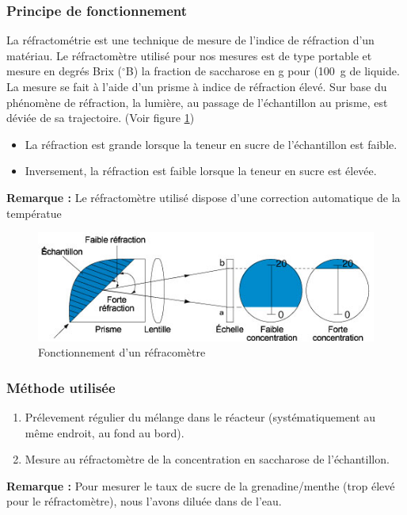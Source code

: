 \documentclass[a4paper,11pt, french]{article}
\begin{document}
		\subsubsection{Principe de fonctionnement}
			La réfractométrie est une technique de mesure de l'indice de réfraction d'un matériau. Le réfractomètre utilisé pour nos mesures est de type portable et mesure en degrés Brix ($^{\circ}$B) la fraction de saccharose en \si{\gram} pour (\SI{100}{\gram} de liquide. La mesure se fait à l'aide d'un prisme à indice de réfraction élevé. Sur base du phénomène de réfraction, la lumière, au passage de l'échantillon au prisme, est déviée de sa trajectoire. (Voir figure \ref{refractometrie})
			\begin{itemize}
				\item La réfraction est grande lorsque la teneur en sucre de l'échantillon est faible.
				\item Inversement, la réfraction est faible lorsque la teneur en sucre est élevée.
			\end{itemize}
			\textbf{Remarque :} Le réfractomètre utilisé dispose d'une correction automatique de la températue
			\begin{figure}[h]
				\centering
				\includegraphics[width=1.0\textwidth]{pictures/refractometre.jpg}
				\caption{Fonctionnement d'un réfracomètre\label{refractometrie}\protect\footnotemark}
			\end{figure}
		\subsubsection{Méthode utilisée}
			\begin{enumerate}
				\item Prélevement régulier du mélange dans le réacteur (systématiquement au même endroit, au fond au bord).
				\item Mesure au réfractomètre de la concentration en saccharose de l'échantillon.
			\end{enumerate}
			\textbf{Remarque :} Pour mesurer le taux de sucre de la grenadine/menthe (trop élevé pour le réfractomètre), nous l'avons diluée dans de l'eau.
\end{document}
